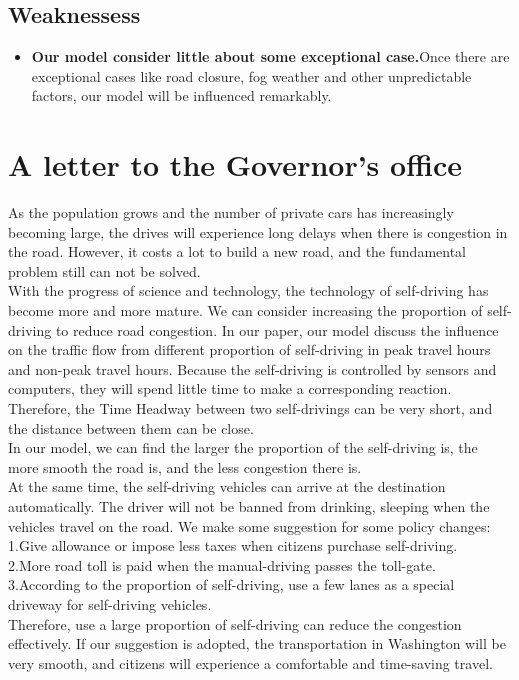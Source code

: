 \documentclass{mcmthesis}
\begin{document}
\subsection{Weaknessess}

\begin{itemize}
\item{\textbf{Our model consider little about some exceptional case.}Once there are exceptional cases like road closure, fog weather and other unpredictable factors, our model will be influenced remarkably.}
\end{itemize}
\section{A letter to the Governor's office}
As the population grows and the number of private cars has increasingly becoming large, the drives will experience long delays when there is congestion in the road. However, it costs a lot to build a new road, and the fundamental problem still can not be solved.\\
\indent With the progress of science and technology, the technology of self-driving has become more and more mature. We can consider increasing the proportion of self-driving to reduce road congestion.
In our paper, our model discuss the influence on the traffic flow from different proportion of self-driving in peak travel hours and non-peak travel hours. Because the self-driving is controlled by sensors and computers, they will spend little time to make a corresponding reaction. Therefore, the Time Headway between two self-drivings can be very short, and the distance between them can be close.\\ \indent In our model, we can find the larger the proportion of the self-driving is, the more smooth the road is, and the less congestion there is. \\
\indent At the same time, the self-driving vehicles can arrive at the destination automatically. The driver will not be banned from drinking, sleeping when the vehicles travel on the road.
We make some suggestion for some policy changes:\\
\indent 1.Give allowance or impose less taxes when citizens purchase self-driving.\\
\indent 2.More road toll is paid when the manual-driving passes the toll-gate.\\
\indent 3.According to the proportion of self-driving, use a few lanes as a special driveway for self-driving vehicles.\\
\indent Therefore, use a large proportion of self-driving can reduce the congestion effectively. If our suggestion is adopted, the transportation in Washington will be very smooth, and citizens will experience a comfortable and time-saving travel. 
\end{document}
